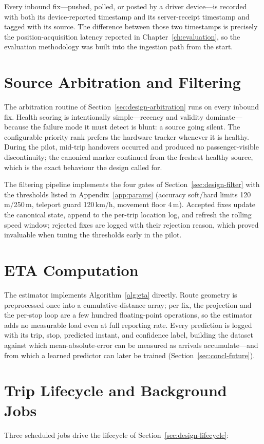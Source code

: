 Every inbound fix---pushed, polled, or posted by a driver device---is
recorded with both its device-reported timestamp and its server-receipt
timestamp and tagged with its source. The difference between those two
timestamps is precisely the position-acquisition latency reported in
Chapter~\ref{ch:evaluation}, so the evaluation methodology was built into
the ingestion path from the start.

\section{Source Arbitration and Filtering}
\label{sec:impl-arbitration}
The arbitration routine of Section~\ref{sec:design-arbitration} runs on
every inbound fix. Health scoring is intentionally simple---recency and
validity dominate---because the failure mode it must detect is blunt: a
source going silent. The configurable priority rank prefers the hardware
tracker whenever it is healthy. During the pilot, mid-trip handovers
occurred and produced no passenger-visible discontinuity; the canonical
marker continued from the freshest healthy source, which is the exact
behaviour the design called for.

The filtering pipeline implements the four gates of
Section~\ref{sec:design-filter} with the thresholds listed in
Appendix~\ref{app:params} (accuracy soft/hard limits 120\,m/250\,m,
teleport guard 120\,km/h, movement floor 4\,m). Accepted fixes update the
canonical state, append to the per-trip location log, and refresh the
rolling speed window; rejected fixes are logged with their rejection
reason, which proved invaluable when tuning the thresholds early in the
pilot.

\section{ETA Computation}
\label{sec:impl-eta}
The estimator implements Algorithm~\ref{alg:eta} directly. Route geometry
is preprocessed once into a cumulative-distance array; per fix, the
projection and the per-stop loop are a few hundred floating-point
operations, so the estimator adds no measurable load even at full
reporting rate. Every prediction is logged with its trip, stop, predicted
instant, and confidence label, building the dataset against which
mean-absolute-error can be measured as arrivals accumulate---and from
which a learned predictor can later be trained
(Section~\ref{sec:concl-future}).

\section{Trip Lifecycle and Background Jobs}
\label{sec:impl-lifecycle}
Three scheduled jobs drive the lifecycle of
Section~\ref{sec:design-lifecycle}:


